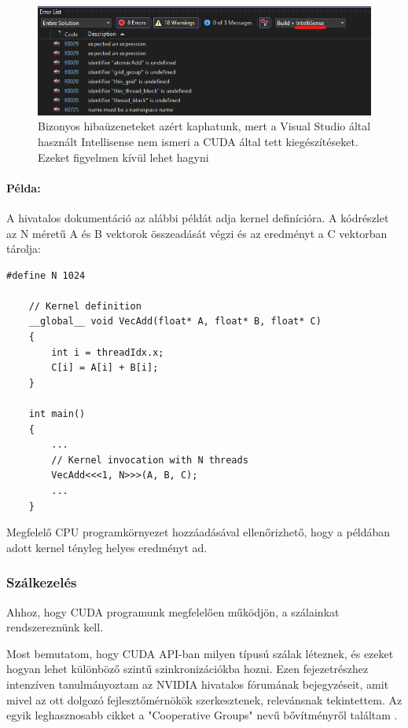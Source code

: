 \begin{figure}[ht!]
	\centering
	\includegraphics[width=150mm, keepaspectratio] {figures/invalidIntellisenseErrorMessages.png}
	\caption{Bizonyos hibaüzeneteket azért kaphatunk, mert a Visual Studio által használt Intellisense nem ismeri a CUDA által tett kiegészítéseket. Ezeket figyelmen kívül lehet hagyni \label{invalidErrors} }
\end{figure}

\paragraph{Példa:} A hivatalos dokumentáció az alábbi példát adja kernel definícióra. A kódrészlet az N méretű A és B vektorok összeadását végzi és az eredményt a C vektorban tárolja:

\begin{lstlisting}[style=CStyle]
	#define N 1024
	
	// Kernel definition
	__global__ void VecAdd(float* A, float* B, float* C)
	{
		int i = threadIdx.x;
		C[i] = A[i] + B[i];
	}
	
	int main()
	{
		...
		// Kernel invocation with N threads
		VecAdd<<<1, N>>>(A, B, C);
		...
	}
\end{lstlisting}

Megfelelő CPU programkörnyezet hozzáadásával ellenőrizhető, hogy a példában adott kernel tényleg helyes eredményt ad.

\subsubsection{Szálkezelés}
Ahhoz, hogy CUDA programunk megfelelően működjön, a szálainkat rendszereznünk kell. 

Most bemutatom, hogy CUDA API-ban milyen típusú szálak léteznek, és ezeket hogyan lehet különböző szintű szinkronizációkba hozni. Ezen fejezetrészhez intenzíven tanulmányoztam az NVIDIA hivatalos fórumának bejegyzéseit, amit mivel az ott dolgozó fejlesztőmérnökök szerkesztenek, relevánsnak tekintettem. Az egyik leghasznosabb cikket a "Cooperative Groups" nevű bővítményről találtam \cite{CUDAcoopgroups}.

